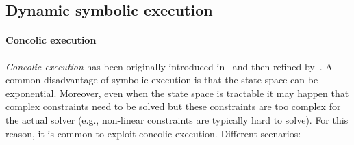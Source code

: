 \subsection{Dynamic symbolic execution}


\paragraph{Concolic execution}
\label{concolic-execution}
{\em Concolic execution} has been originally introduced in~\cite{DART-PLDI05} and then refined by~\cite{CUTE-FSE13}. A common disadvantage of symbolic execution is that the state space can be exponential. Moreover, even when the state space is tractable it may happen that complex constraints need to be solved but these constraints are too complex for the actual solver (e.g., non-linear constraints are typically hard to solve). For this reason, it is common to exploit concolic execution. Different scenarios:
